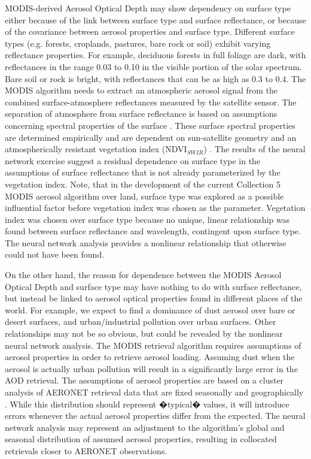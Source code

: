 \documentclass[journal]{IEEEtran}
\begin{document}
MODIS-derived Aerosol Optical Depth may show dependency on surface type either because of the link between surface type and surface reflectance, or because of the covariance between aerosol properties and surface type.  Different surface types (e.g. forests, croplands, pastures, bare rock or soil) exhibit varying reflectance properties.  For example, deciduous forests in full foliage are dark, with reflectances in the range 0.03 to 0.10 in the visible portion of the solar spectrum. Bare soil or rock is bright, with reflectances that can be as high as 0.3 to 0.4.  The MODIS algorithm needs to extract an atmospheric aerosol signal from the combined surface-atmosphere reflectances measured by the satellite sensor.  The separation of atmosphere from surface reflectance is based on assumptions concerning spectral properties of the surface \cite{Levy:2007a}.   These surface spectral properties are determined empirically and are dependent on sun-satellite geometry and an atmospherically resistant vegetation index (NDVI$_{SWIR}$) \cite{Levy:2007a, Karnieli:2001}.  The results of the neural network exercise suggest a residual dependence on surface type in the assumptions of surface reflectance that is not already parameterized by the vegetation index.  Note, that in the development of the current Collection 5 MODIS aerosol algorithm over land, surface type was explored as a possible influential factor before vegetation index was chosen as the parameter.  Vegetation index was chosen over surface type because no unique, linear relationship was found between surface reflectance and wavelength, contingent upon surface type.  The neural network analysis provides a nonlinear relationship that otherwise could not have been found.

On the other hand, the reason for dependence between the MODIS Aerosol Optical Depth and surface type may have nothing to do with surface reflectance, but instead be linked to aerosol optical properties found in different places of the world.  For example, we expect to find a dominance of dust aerosol over bare or desert surfaces, and urban/industrial pollution over urban surfaces.  Other relationships may not be so obvious, but could be revealed by the nonlinear neural network analysis.  The MODIS retrieval algorithm requires assumptions of aerosol properties in order to retrieve aerosol loading.  Assuming dust when the aerosol is actually urban pollution will result in a significantly large error in the AOD retrieval.  The assumptions of aerosol properties are based on a cluster analysis of AERONET retrieval data that are fixed seasonally and geographically \cite{Levy:2007b}.  While this distribution should represent �typical� values, it will introduce errors whenever the actual aerosol properties differ from the expected.  The neural network analysis may represent an adjustment to the algorithm's global and seasonal distribution of assumed aerosol properties, resulting in collocated retrievals closer to AERONET observations.
\end{document}
